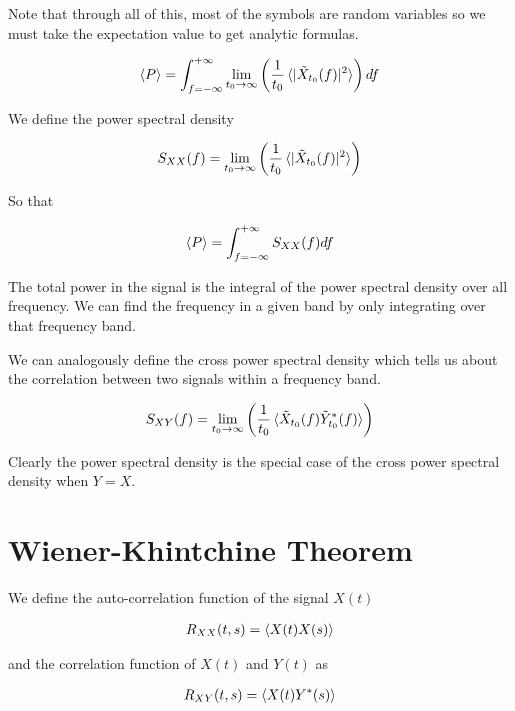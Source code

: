 \documentclass[12pt]{article}
\begin{document}
Note that through all of this, most of the symbols are random variables so we must take the expectation value to get analytic formulas.

\begin{align}
\braket{P} = \int_{f=-\infty}^{+\infty} \lim_{t_0\rightarrow \infty}\left(  \frac{1}{t_0}  \braket{|\tilde{X}_{t_0}(f)|^2 }\right)df
\end{align}

We define the power spectral density

\begin{align}
S_{XX}(f) = \lim_{t_0\rightarrow \infty}\left( \frac{1}{t_0}  \braket{|\tilde{X}_{t_0}(f)|^2 }\right)
\end{align}

So that

\begin{align}
\braket{P} = \int_{f=-\infty}^{+\infty} S_{XX}(f) df
\end{align}

The total power in the signal is the integral of the power spectral density over all frequency. We can find the frequency in a given band by only integrating over that frequency band.

We can analogously define the cross power spectral density which tells us  about the correlation between two signals within a frequency band.

\begin{align}
S_{XY}(f) = \lim_{t_0\rightarrow{\infty}}\left(\frac{1}{t_0}\braket{\tilde{X}_{t_0}(f)\tilde{Y}^*_{t_0}(f)}\right)
\end{align}

Clearly the power spectral density is the special case of the cross power spectral density when $Y=X$.

\section{Wiener-Khintchine Theorem}

We define the auto-correlation function of the signal $X(t)$

\begin{align}
R_{XX}(t,s) = \braket{X(t)X(s)}
\end{align}

and the correlation function of $X(t)$ and $Y(t)$ as

\begin{align}
R_{XY}(t,s) = \braket{X(t)Y^*(s)}
\end{align}
\end{document}
